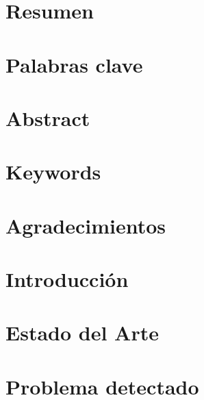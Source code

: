 \documentclass[11pt]{article}
\begin{document}
\setcounter{page}{1} %

\section{Resumen}



\section{Palabras clave}



\newpage

\section{Abstract}



\section{Keywords}



\newpage

\section{Agradecimientos}



\newpage

\section{Introducción}



\section{Estado del Arte}



\section{Problema detectado}



\newpage
\end{document}
